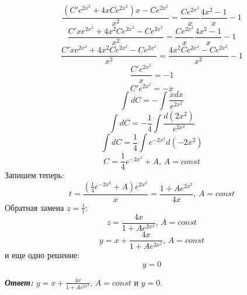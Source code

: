 \documentclass[a5paper, 10pt]{article}
\theoremstyle{definition}
\theoremstyle{plain}
\theoremstyle{remark}
\begin{document}
\begin{equation*}
  \frac{(C' e^{ 2 x^2 } + 4xCe^{ 2 x^2 } ) x - C e^{ 2 x^2 }}{x^2}   =  \frac{C e^{ 2 x^2 }}{x} \frac{4x^2 - 1}{x} - 1 
\end{equation*}
\begin{equation*}
  \frac{C'x e^{ 2 x^2 } + 4x^2Ce^{ 2 x^2 } - C e^{ 2 x^2 }}{x^2}   =  \frac{C e^{ 2 x^2 }}{x} \frac{4x^2 - 1}{x} - 1 
\end{equation*}
\begin{equation*}
  \frac{C'x e^{ 2 x^2 } + 4x^2Ce^{ 2 x^2 } - C e^{ 2 x^2 }}{x^2}   =  \frac{4x^2C e^{ 2 x^2 } - C e^{ 2 x^2 }}{x^2}  - 1 
\end{equation*}
\begin{equation*}
  \frac{C'e^{ 2 x^2 } }{x}   =   - 1 
\end{equation*}
\begin{equation*}
  C'e^{ 2 x^2 }    =   - x 
\end{equation*}
\begin{equation*}
  \int dC  =   -\int \frac{xdx}{e^{ 2 x^2 }}
\end{equation*}
\begin{equation*}
  \int dC  =   - \frac{1}{4}\int \frac{d(2x^2)}{e^{ 2 x^2 }}
\end{equation*}
\begin{equation*}
  \int dC  =    \frac{1}{4}\int e^{- 2 x^2} d(-2x^2)
\end{equation*}
\begin{equation*}
 C  =    \frac{1}{4} e^{- 2 x^2} + A, \, A = const
\end{equation*}
Запишем теперь:
\begin{equation*} 
 t =  \frac{\left( \frac{1}{4} e^{- 2 x^2} + A \right) e^{ 2 x^2 }}{x} =  \frac{ 1 + A  e^{ 2 x^2 }}{4x}, \, A = const
\end{equation*} 
Обратная замена $ z = \frac{1}{t}$:
\begin{equation*} 
 z =    \frac{4x }{  1 + A  e^{ 2 x^2 }}, \, A = const
\end{equation*} 
\begin{equation*} 
 y =   x + \frac{4x }{  1 + A  e^{ 2 x^2 }}, \, A = const
\end{equation*} 
и еще одно решение:
\begin{equation*} 
 y =   0
\end{equation*} 

\textit{\textbf{Ответ:}} $ y =   x + \frac{4x }{  1 + A  e^{ 2 x^2 }}, \, A = const$ и $ y =   0$.
\end{document}
